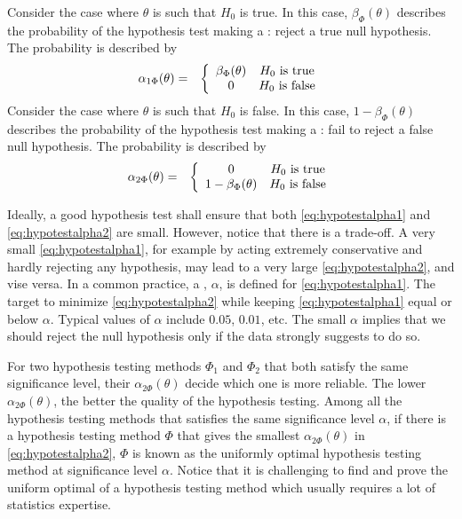 Consider the case where $\theta$ is such that $H_0$ is true. In this case, $\beta_\Phi(\theta)$ describes the probability of the hypothesis test making a : reject a true null hypothesis. The probability is described by
\begin{eqnarray}
	\alpha_{1\Phi}(\theta) &=& \left\{\begin{array}{cc}
		\beta_\Phi(\theta) & H_0 \textup{~is true} \\
		0 & H_0 \textup{~is false}
	\end{array}\right. \label{eq:hypotestalpha1}
\end{eqnarray}
Consider the case where $\theta$ is such that $H_0$ is false. In this case, $1-\beta_\Phi(\theta)$ describes the probability of the hypothesis test making a : fail to reject a false null hypothesis. The probability is described by
\begin{eqnarray}
	\alpha_{2\Phi}(\theta) &=& \left\{\begin{array}{cc}
		0 & H_0 \textup{~is true} \\
		1-\beta_\Phi(\theta) & H_0 \textup{~is false}
	\end{array}\right. \label{eq:hypotestalpha2}
\end{eqnarray}

Ideally, a good hypothesis test shall ensure that both \eqref{eq:hypotestalpha1} and \eqref{eq:hypotestalpha2} are small. However, notice that there is a trade-off. A very small \eqref{eq:hypotestalpha1}, for example by acting extremely conservative and hardly rejecting any hypothesis, may lead to a very large \eqref{eq:hypotestalpha2}, and vise versa. In a common practice, a , $\alpha$, is defined for \eqref{eq:hypotestalpha1}. The target to minimize \eqref{eq:hypotestalpha2} while keeping \eqref{eq:hypotestalpha1} equal or below $\alpha$. Typical values of $\alpha$ include $0.05$, $0.01$, etc. The small $\alpha$ implies that we should reject the null hypothesis only if the data strongly suggests to do so.

For two hypothesis testing methods $\Phi_1$ and $\Phi_2$ that both satisfy the same significance level, their $\alpha_{2\Phi}(\theta)$ decide which one is more reliable. The lower $\alpha_{2\Phi}(\theta)$, the better the quality of the hypothesis testing. Among all the hypothesis testing methods that satisfies the same significance level $\alpha$, if there is a hypothesis testing method $\Phi$ that gives the smallest $\alpha_{2\Phi}(\theta)$ in \eqref{eq:hypotestalpha2}, $\Phi$ is known as the uniformly optimal hypothesis testing method at significance level $\alpha$. Notice that it is challenging to find and prove the uniform optimal of a hypothesis testing method which usually requires a lot of statistics expertise.

